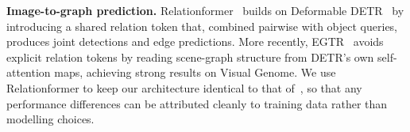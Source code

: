 \noindent\textbf{Image-to-graph prediction.}
Relationformer~\cite{shit2022} builds on Deformable DETR~\cite{zhu2021}
by introducing a shared relation token that, combined pairwise with
object queries, produces joint detections and edge predictions.
More recently, EGTR~\cite{im2024} avoids explicit relation tokens by
reading scene-graph structure from DETR's own self-attention maps,
achieving strong results on Visual Genome.
We use Relationformer to keep our architecture identical to that
of~\cite{sturmer2025}, so that any performance differences can be
attributed cleanly to training data rather than modelling choices.
